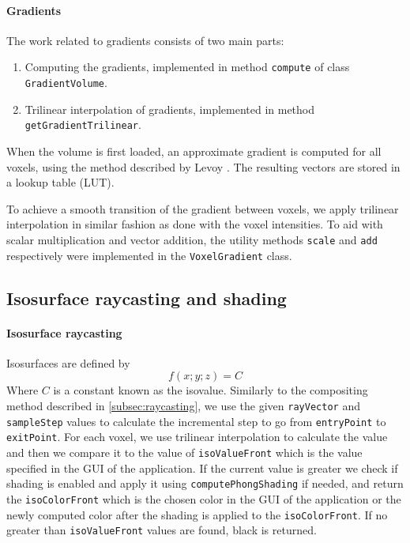 \documentclass[a4paper]{article}
\begin{document}
\paragraph{Gradients}
\label{subsec:gradients}

The work related to gradients consists of two main parts:

\begin{enumerate}[noitemsep]
  \item Computing the gradients, implemented in method {\tt compute} of class {\tt GradientVolume}.
  \item Trilinear interpolation of gradients, implemented in method {\tt getGradientTrilinear}.
\end{enumerate}

\noindent When the volume is first loaded, an approximate gradient is computed for all voxels, using the method described by Levoy \citep{levoy_1988}. The resulting vectors are stored in a lookup table (LUT).

To achieve a smooth transition of the gradient between voxels, we apply trilinear interpolation in similar fashion as done with the voxel intensities. To aid with scalar multiplication and vector addition, the utility methods {\tt scale} and {\tt add} respectively were implemented in the {\tt VoxelGradient} class.

\subsection{Isosurface raycasting and shading}
\label{subsec:isosurface}

\paragraph{Isosurface raycasting}

Isosurfaces are defined by
 $$f(x; y; z) = C$$ 
Where $C$ is a constant known as the isovalue. Similarly to the compositing method described in \autoref{subsec:raycasting}, we use the given {\tt rayVector} and {\tt sampleStep} values to calculate the incremental step to go from {\tt entryPoint} to {\tt exitPoint}. For each voxel, we use trilinear interpolation to calculate the value and then we compare it to the value of {\tt isoValueFront} which is the value specified in the GUI of the application. If the current value is greater we check if shading is enabled and apply it using {\tt computePhongShading} if needed, and return the {\tt isoColorFront} which is the chosen color in the GUI of the application or the newly computed color after the shading is applied to the  {\tt isoColorFront}. If no greater than {\tt isoValueFront} values are found, black is returned.
\end{document}
